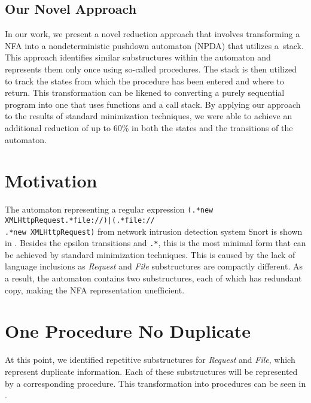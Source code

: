 \documentclass{ExcelAtFIT}
\begin{document}
	\subsection*{Our Novel Approach}
		In our work, we present a novel reduction approach that involves transforming a NFA into a nondeterministic pushdown automaton (NPDA) that utilizes a~stack. This approach identifies similar substructures within the automaton and represents them only once using so-called procedures. The stack is then utilized to track the states from which the procedure has been entered and where to return. This transformation can be likened to converting a purely sequential program into one that uses functions and a call stack. By applying our approach to the results of standard minimization techniques, we were able to achieve an additional reduction of up to 60\% in both the states and the transitions of the automaton.

\section{Motivation}
	The automaton representing a regular expression \texttt{(.*new XMLHttpRequest.*file://)|(.*file://\\.*new XMLHttpRequest)} from network intrusion detection system Snort \cite{Snort} is shown in . Besides the epsilon transitions and \texttt{.*}, this is the most minimal form that can be achieved by standard minimization techniques. This is caused by the lack of language inclusions as  \textit{Request} and \textit{File} substructures are compactly different. As a result, the automaton contains two substructures, each of which has redundant copy, making the NFA representation unefficient.

\section{One Procedure No Duplicate}
	At this point, we identified repetitive substructures for \textit{Request} and \textit{File}, which represent duplicate information. Each of these substructures will be represented by a corresponding procedure. This transformation into procedures can be seen in .
\end{document}
